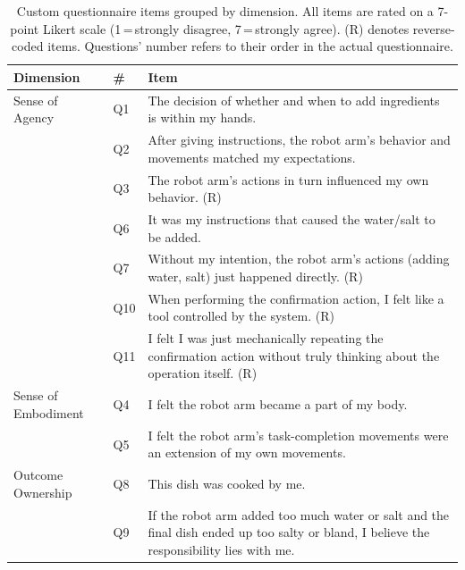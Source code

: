 \documentclass[sigconf,review,anonymous]{acmart}
\begin{document}
\begin{table}[t]
\centering
\caption{Custom questionnaire items grouped by dimension. All items are rated on a 7-point Likert scale (1\,=\,strongly disagree, 7\,=\,strongly agree). (R) denotes reverse-coded items. Questions' number refers to their order in the actual questionnaire.}
\label{tab:questionnaire}
\scriptsize
\setlength{\tabcolsep}{3pt}
\begin{tabular}{@{}llp{11.5cm}@{}}
\toprule
\textbf{Dimension} & \textbf{\#} & \textbf{Item} \\
\midrule
Sense of Agency & Q1 & The decision of whether and when to add ingredients is within my hands. \\
 & Q2 & After giving instructions, the robot arm's behavior and movements matched my expectations. \\
 & Q3 & The robot arm's actions in turn influenced my own behavior. (R) \\
 & Q6 & It was my instructions that caused the water/salt to be added. \\
 & Q7 & Without my intention, the robot arm's actions (adding water, salt) just happened directly. (R) \\
 & Q10 & When performing the confirmation action, I felt like a tool controlled by the system. (R) \\
 & Q11 & I felt I was just mechanically repeating the confirmation action without truly thinking about the operation itself. (R) \\
\midrule
Sense of Embodiment & Q4 & I felt the robot arm became a part of my body. \\
 & Q5 & I felt the robot arm's task-completion movements were an extension of my own movements. \\
\midrule
Outcome Ownership & Q8 & This dish was cooked by me. \\
 & Q9 & If the robot arm added too much water or salt and the final dish ended up too salty or bland, I believe the responsibility lies with me. \\
\bottomrule
\end{tabular}
\end{table}
\end{document}

